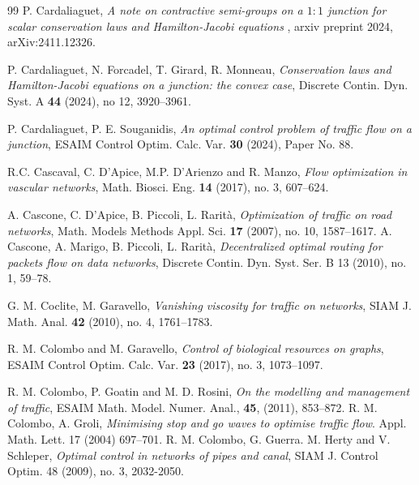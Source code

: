 \documentclass[a4paper, 10pt, final]{article}
\begin{document}
\begin{thebibliography}{99}
 P. Cardaliaguet, 
\textsl{A note on contractive semi-groups on a $1:1$ junction for scalar conservation laws and Hamilton-Jacobi equations
}, arxiv preprint 2024,  	arXiv:2411.12326.

P. Cardaliaguet, N. Forcadel,  T. Girard, 
R. Monneau,  \textsl{Conservation laws and {H}amilton-{J}acobi equations on a junction: the convex case},
Discrete Contin. Dyn. Syst. A
  \textbf{44} (2024), no 12, 3920--3961.
	
P. Cardaliaguet, P. E.  Souganidis,  \textsl{An optimal control problem of traffic flow on a junction},
 ESAIM Control Optim. Calc. Var. \textbf{30} (2024), Paper No. 88. 
 
  R.C. Cascaval, C. D'Apice, M.P. D'Arienzo and R. Manzo,
\textsl{Flow optimization in vascular networks}, 
Math. Biosci. Eng.  \textbf{14} (2017), no. 3, 607--624. 

 A. Cascone, C. D'Apice, B. Piccoli, L. Rarit\`a, 
\textsl{Optimization of traffic on road networks}, 
Math. Models Methods Appl. Sci. \textbf{17} (2007), no. 10, 1587--1617.
%
% 
 A. Cascone, A. Marigo, B. Piccoli, L. Rarit\`a, 
\textsl{Decentralized optimal routing for packets flow on data networks}, 
Discrete Contin. Dyn. Syst. Ser. B 13 (2010), no. 1, 59--78.
 
 G. M. Coclite, M. Garavello,
\textsl{ Vanishing viscosity for traffic on networks}, SIAM J. Math. Anal. \textbf{42} 
(2010), no. 4, 1761--1783.


  R. M. Colombo and M. Garavello, \textsl{Control of biological resources on graphs},
 ESAIM Control Optim. Calc. Var. \textbf{23} (2017), no. 3, 1073–1097.

%    
   R. M. Colombo, P. Goatin and M. D. Rosini, \textsl{On the modelling and management of traffic},
 ESAIM Math. Model. Numer. Anal., {\bf 45}, (2011), 853--872.
%
 R. M. Colombo, A. Groli, \textsl{Minimising stop and go waves to optimise traffic flow}. Appl. Math. Lett. 17 (2004) 697--701.
%
 R. M. Colombo, G. Guerra. M. Herty and V. Schleper, 
 \textsl{Optimal control in networks of pipes and canal},  
 SIAM J. Control Optim. 48 (2009), no. 3, 2032-2050.
 

\end{thebibliography}
\end{document}
